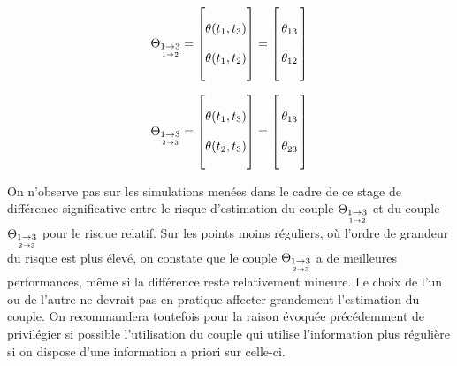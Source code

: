 \begin{minipage}{0.5\textwidth}
	\begin{equation}
		\displaystyle
		\Theta_{\underset{1 \rightarrow 2}{1 \rightarrow 3}} = \begin{bmatrix} \\ \theta(t_1, t_3) \\\\ \theta(t_1, t_2) \\ \phantom{.}\end{bmatrix}
				= \begin{bmatrix} \\ \, \theta_{13}\,  \\\\ \,  \theta_{12} \,  \\ \phantom{.}\end{bmatrix}
	\end{equation}
\end{minipage}
\hfill
\begin{minipage}{0.5\textwidth}
	\begin{equation}
		\displaystyle
		\Theta_{\underset{2 \rightarrow 3}{1 \rightarrow 3}} = \begin{bmatrix} \\ \theta(t_1, t_3) \\\\ \theta(t_2, t_3) \\ \phantom{.} \end{bmatrix}
				= \begin{bmatrix} \\ \,  \theta_{13} \,  \\\\ \, \theta_{23} \,  \\ \phantom{.}\end{bmatrix}
	\end{equation}
\end{minipage}



On n'observe pas sur les simulations menées dans le cadre de ce stage de différence significative entre le risque d'estimation du couple $\Theta_{\underset{1 \rightarrow 2}{1 \rightarrow 3}}$ et du couple $\Theta_{\underset{2 \rightarrow 3}{1 \rightarrow 3}}$ pour le risque relatif. Sur les points moins réguliers, où l'ordre de grandeur du risque est plus élevé, on constate que le couple $\Theta_{\underset{2 \rightarrow 3}{1 \rightarrow 3}}$ a de meilleures performances, même si la différence reste relativement mineure. Le choix de l'un ou de l'autre ne devrait pas en pratique affecter grandement l'estimation du couple. On recommandera toutefois pour la raison évoquée précédemment de privilégier si possible l'utilisation du couple qui utilise l'information plus régulière si on dispose d'une information a priori sur celle-ci.

